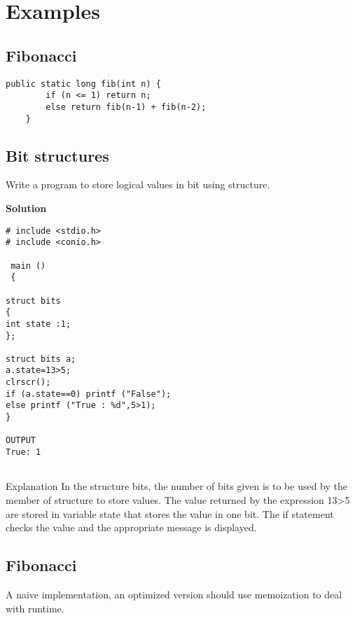 \documentclass[letterpaper]{article}
\begin{document}
\section{Examples}
\subsection{Fibonacci}
\begin{lstlisting}
public static long fib(int n) {
        if (n <= 1) return n;
        else return fib(n-1) + fib(n-2);
    }
    \end{lstlisting}
    
\subsection{Bit structures}

Write a program to store logical values in bit using structure.

\textbf{Solution}
\begin{verbatim}
# include <stdio.h>
# include <conio.h>

 main ()
 {

struct bits
{
int state :1;
};

struct bits a;
a.state=13>5;
clrscr();
if (a.state==0) printf ("False");
else printf ("True : %d",5>1);
}

OUTPUT
True: 1


\end{verbatim}

Explanation In the structure bits, the number of bits given is to be used by the member of structure to store values. The value returned by the expression 13>5 are stored in variable state that stores the value in one bit. The if statement checks the value and the appropriate message is displayed.

\subsection{Fibonacci}
A naive implementation, an optimized version should use memoization to deal with runtime.
\end{document}

